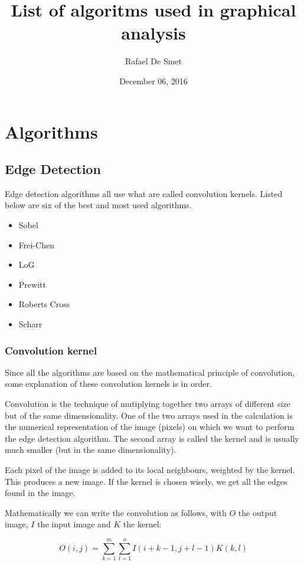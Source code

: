 \documentclass[12pt]{article}
\begin{document}
\title{List of algoritms used in graphical analysis}
\date{December 06, 2016}
\author{Rafael De Smet}

\maketitle

\section{Algorithms}
\subsection{Edge Detection}

Edge detection algorithms all use what are called convolution kernels. Listed below are six of the best and most used algorithms.

\begin{itemize}
	\item Sobel 
	\item Frei-Chen
	\item LoG
	\item Prewitt
	\item Roberts Cross
	\item Scharr
\end{itemize}

\subsubsection{Convolution kernel}
Since all the algorithms are based on the mathematical principle of convolution, some explanation of these convolution kernels is in order. 

Convolution is the technique of mutiplying together two arrays of different size but of the same dimensionality. One of the two arrays used in the calculation is the numerical representation of the image (pixels) on which we want to perform the edge detection algorithm. The second array is called the kernel and is usually much smaller (but in the same dimensionality).

Each pixel of the image is added to its local neighbours, weighted by the kernel. This produces a new image. If the kernel is chosen wisely, we get all the edges found in the image.

Mathematically we can write the convolution as follows, with $O$ the output image, $I$ the input image and $K$ the kernel:

\begin{equation}
O(i, j) =  \sum\limits_{k=1}^m\sum\limits_{l=1}^n I(i + k - 1, j + l - 1)K(k,l)
\end{equation}
\end{document}
